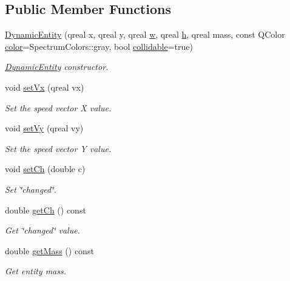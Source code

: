 \subsection*{Public Member Functions}
\begin{DoxyCompactItemize}
\item 
\hyperlink{class_dynamic_entity_a7838d2a20f19bd50a855a6de55522b9d}{Dynamic\+Entity} (qreal x, qreal y, qreal \hyperlink{class_entity_a351a26475f8c124429a638483e95fa8e}{w}, qreal \hyperlink{class_entity_a639fea375adab80851778acb51757fb8}{h}, qreal mass, const Q\+Color \hyperlink{class_entity_ad14bf88ca550e2e5b13438a3faf545e6}{color}=Spectrum\+Colors\+::gray, bool \hyperlink{class_entity_a0d21d9ca00bc81494aec120c0840c191}{collidable}=true)
\begin{DoxyCompactList}\small\item\em \hyperlink{class_dynamic_entity}{Dynamic\+Entity} constructor. \end{DoxyCompactList}\item 
void \hyperlink{class_dynamic_entity_a6bc80eeb1cd3d329233eb9582a99fea4}{set\+Vx} (qreal vx)
\begin{DoxyCompactList}\small\item\em Set the speed vector X value. \end{DoxyCompactList}\item 
void \hyperlink{class_dynamic_entity_a8b4604ccca578bc4a20a18333b498c0a}{set\+Vy} (qreal vy)
\begin{DoxyCompactList}\small\item\em Set the speed vector Y value. \end{DoxyCompactList}\item 
void \hyperlink{class_dynamic_entity_a556f50037ce6eb99cd7d1498242e1e85}{set\+Ch} (double c)
\begin{DoxyCompactList}\small\item\em Set \char`\"{}changed\char`\"{}. \end{DoxyCompactList}\item 
double \hyperlink{class_dynamic_entity_acb49f1128f7ddc9b3c531c8c2187d97f}{get\+Ch} () const
\begin{DoxyCompactList}\small\item\em Get \char`\"{}changed\char`\"{} value. \end{DoxyCompactList}\item 
double \hyperlink{class_dynamic_entity_a31d63938cbf1108662af89abb31627cb}{get\+Mass} () const
\begin{DoxyCompactList}\small\item\em Get entity mass. \end{DoxyCompactList}\item 

\end{DoxyCompactItemize}
